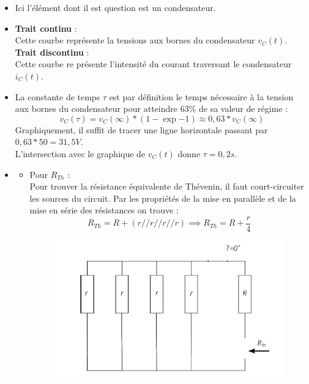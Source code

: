 \begin{itemize}
    \item {}
    {
    Ici l'élément dont il est question est un condensateur.
    }
    \item {}
    {
    \textbf{Trait continu} :\\
    Cette courbe représente la tensions aux bornes du condensateur $v_C(t)$.\\
    \textbf{Trait discontinu} :\\
    Cette courbe re présente l'intensité du courant traversant le condensateur $i_C(t)$.
    }
    \item {}
    {
    La constante de temps $\tau$ est par définition le temps nécessaire à la tension aux bornes du condensateur pour atteindre 63\% de sa valeur de régime :
    \begin{equation*}
        v_C(\tau) = v_C(\infty) *(1-\exp{-1})\approx 0,63*v_C(\infty)
    \end{equation*}
    Graphiquement, il suffit de tracer une ligne horizontale passant par $0,63*50 = 31,5V$.\\
    L'intersection avec le graphique de $v_C(t)$ donne $\tau = 0,2s$.
    }
    \newpage\item {}
    {
    \begin{itemize}
        \item Pour $R_{Th}$ :\\
        Pour trouver la résistance équivalente de Thévenin, il faut court-circuiter les sources du circuit.
        Par les propriétés de la mise en parallèle et de la mise en série des résistances on trouve : 
        \begin{equation*}
            R_{Th} = R + (r//r//r//r)\implies R_{Th}=R+\dfrac{r}{4}
        \end{equation*}
        \begin{figure}[h!!!]
            \centering
            \includegraphics[width = 10cm]{TpQEx_Circuits/TP11Q2_Reso1.PNG}

\end{figure}
\end{itemize}}
\end{itemize}
